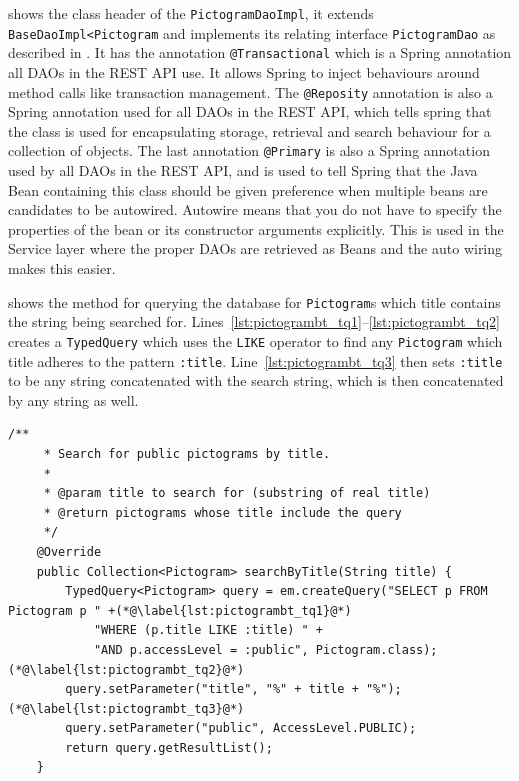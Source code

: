  shows the class header of the \texttt{PictogramDaoImpl}, it extends \texttt{BaseDaoImpl<Pictogram} and implements its relating interface \texttt{PictogramDao} as described in .
It has the annotation \texttt{@Transactional} which is a Spring annotation all DAOs in the REST API use.
It allows Spring to inject behaviours around method calls like transaction management.
The \texttt{@Reposity} annotation is also a Spring annotation used for all DAOs in the REST API, which tells spring that the class is used for encapsulating storage, retrieval and search behaviour for a collection of objects.
The last annotation \texttt{@Primary} is also a Spring annotation used by all DAOs in the REST API, and is used to tell Spring that the Java Bean containing this class should be given preference when multiple beans are candidates to be autowired.
Autowire means that you do not have to specify the properties of the bean or its constructor arguments explicitly.
This is used in the Service layer where the proper DAOs are retrieved as Beans and the auto wiring makes this easier.

\bigskip
{} shows the method for querying the database for \texttt{Pictogram}s which title contains the string being searched for.
Lines~\ref{lst:pictogrambt_tq1}--\ref{lst:pictogrambt_tq2} creates a \texttt{TypedQuery} which uses the \texttt{LIKE} operator to find any \texttt{Pictogram} which title adheres to the pattern \texttt{:title}.
Line~\ref{lst:pictogrambt_tq3} then sets \texttt{:title} to be any string concatenated with the search string, which is then concatenated by any string as well.
\begin{lstlisting}[float, floatplacement=h, caption={The method which searches through all \texttt{Pictogram}s by their titles.},label={lst:pictogramByTitle}]
    /**
     * Search for public pictograms by title.
     *
     * @param title to search for (substring of real title)
     * @return pictograms whose title include the query
     */
    @Override
    public Collection<Pictogram> searchByTitle(String title) {
        TypedQuery<Pictogram> query = em.createQuery("SELECT p FROM Pictogram p " +(*@\label{lst:pictogrambt_tq1}@*)
            "WHERE (p.title LIKE :title) " +
            "AND p.accessLevel = :public", Pictogram.class);(*@\label{lst:pictogrambt_tq2}@*)
        query.setParameter("title", "%" + title + "%");(*@\label{lst:pictogrambt_tq3}@*)
        query.setParameter("public", AccessLevel.PUBLIC);
        return query.getResultList();
    }
\end{lstlisting}

